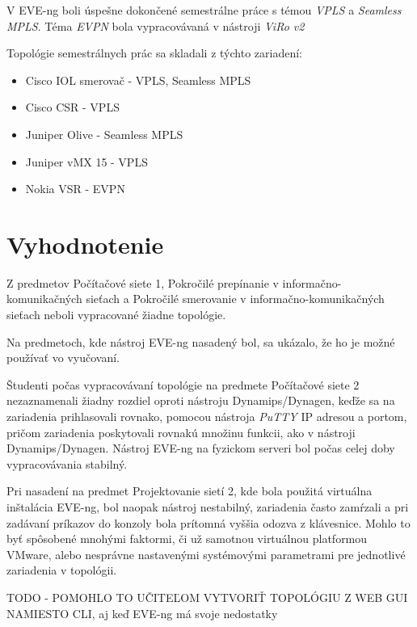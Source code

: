 V EVE-ng boli úspešne dokončené semestrálne práce s témou \emph{VPLS} a \emph{Seamless MPLS}. Téma \emph{EVPN} bola vypracovávaná v nástroji \emph{ViRo v2} 

Topológie semestrálnych prác sa skladali z týchto zariadení:

\begin{itemize}
    \item Cisco IOL smerovač - VPLS, Seamless MPLS
    \item Cisco CSR - VPLS
    \item Juniper Olive - Seamless MPLS
    \item Juniper vMX 15 - VPLS
    \item Nokia VSR - EVPN
\end{itemize}





\section{Vyhodnotenie}

Z predmetov Počítačové siete 1, Pokročilé prepínanie v informačno-komunikačných sieťach a Pokročilé smerovanie v informačno-komunikačných sieťach neboli vypracované žiadne topológie.

Na predmetoch, kde nástroj EVE-ng nasadený bol, sa ukázalo, že ho je možné používať vo vyučovaní.

Študenti počas vypracovávaní topológie na predmete Počítačové siete 2 nezaznamenali žiadny rozdiel oproti nástroju Dynamips/Dynagen, keďže sa na zariadenia prihlasovali rovnako, pomocou nástroja \emph{PuTTY} IP adresou a portom, pričom zariadenia poskytovali rovnakú množinu funkcii, ako v nástroji Dynamips/Dynagen. Nástroj EVE-ng na fyzickom serveri bol počas celej doby vypracovávania stabilný.

Pri nasadení na predmet Projektovanie sietí 2, kde bola použitá virtuálna inštalácia EVE-ng, bol naopak nástroj nestabilný, zariadenia často zamŕzali a pri zadávaní príkazov do konzoly bola prítomná vyššia odozva z klávesnice. Mohlo to byť spôsobené mnohými faktormi, či už samotnou virtuálnou platformou VMware, alebo nesprávne nastavenými systémovými parametrami pre jednotlivé zariadenia v topológii.

{\huge TODO - POMOHLO TO UČITEĽOM VYTVORIŤ TOPOLÓGIU Z WEB GUI NAMIESTO CLI, aj keď EVE-ng má svoje nedostatky}